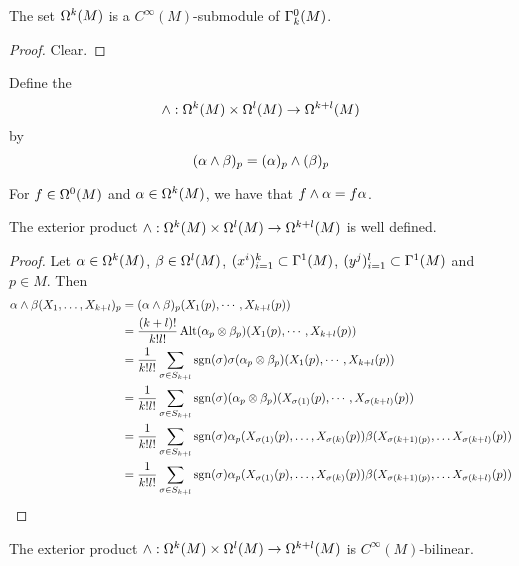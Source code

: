 \documentclass{book}
\begin{document}
	\begin{ex}
	The set $\Omega^k(M)$ is a $C^{\infty}(M)$-submodule of $\Gamma^0_k(M)$.
	\end{ex}
	
	\begin{proof}
	Clear.
	\end{proof}

	

	\begin{defn}
		Define the  $$\wedge: \Omega^k(M) \times \Omega^l(M) \rightarrow \Omega^{k+l}(M) $$ by $$(\alpha \wedge \beta)_p = (\alpha)_p \wedge (\beta)_p$$
	\end{defn}
	
	\begin{note}
		For $f \in \Omega^0(M)$ and $\alpha \in \Omega^k(M)$, we have that $f \wedge \alpha = f \alpha$.
	\end{note}
	
	\begin{ex}
	The exterior product $\wedge: \Omega^k(M) \times \Omega^l(M) \rightarrow \Omega^{k+l}(M) $ is well defined.
	\end{ex}
	
	\begin{proof}
	Let $\alpha \in \Omega^k(M)$, $\beta \in \Omega^l(M)$, $(x^i)_{i=1}^k \subset \Gamma^1(M)$, $(y^j)_{i=1}^l \subset \Gamma^1(M)$ and $p \in M$. Then 
	\begin{align*}
	\alpha \wedge \beta (X_1, \dots, X_{k+l})_p
	&= (\alpha \wedge \beta)_p ({X_1}(p), \cdots, {X_{k+l}}(p)) \\
	&= \frac{(k+l)!}{k! l!} \operatorname{Alt}(\alpha_p \otimes \beta_p)({X_1}(p), \cdots, {X_{k+l}}(p)) \\
	&= \frac{1}{k! l!} \sum_{\sigma \in S_{k+l}} \operatorname{sgn}(\sigma)\sigma (\alpha_p \otimes \beta_p) ({X_1}(p), \cdots, {X_{k+l}}(p)) \\
	&= \frac{1}{k! l!} \sum_{\sigma \in S_{k+l}} \operatorname{sgn}(\sigma)(\alpha_p \otimes \beta_p) (X_{\sigma(1)}(p), \cdots, X_{\sigma(k+l)}(p)) \\
	&= \frac{1}{k! l!} \sum_{\sigma \in S_{k+l}} \operatorname{sgn}(\sigma) \alpha_p(X_{\sigma(1)}(p), \dots,X_{\sigma(k)}(p)) \beta(X_{\sigma(k+1)(p)}, \dots X_{\sigma(k+l)}(p)) \\
	&= \frac{1}{k! l!} \sum_{\sigma \in S_{k+l}} \operatorname{sgn}(\sigma) \alpha_p(X_{\sigma(1)}(p), \dots,X_{\sigma(k)}(p)) \beta(X_{\sigma(k+1)(p)}, \dots X_{\sigma(k+l)}(p)) \\
	\end{align*}	 
	\end{proof}
	
	\begin{ex}
	The exterior product $\wedge: \Omega^k(M) \times \Omega^l(M) \rightarrow \Omega^{k+l}(M) $ is $C^{\infty}(M)$-bilinear.
	\end{ex}
	
\end{document}
